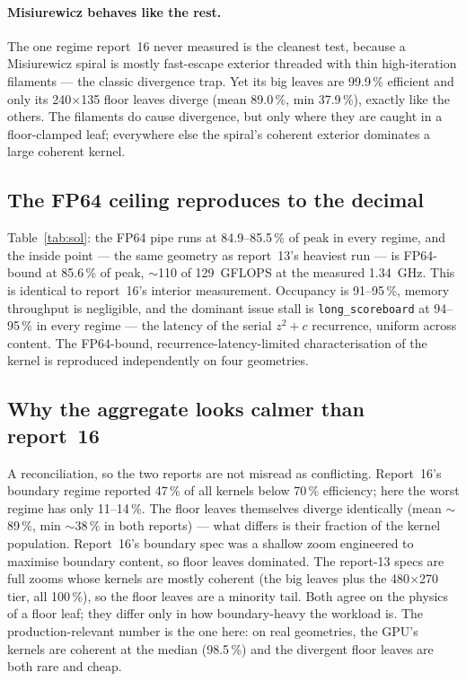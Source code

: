 \documentclass[
	english,
	letterpaper, oneside
]{article}
\begin{document}
\paragraph{Misiurewicz behaves like the rest.} The one regime report~16 never
measured is the cleanest test, because a Misiurewicz spiral is mostly fast-escape
exterior threaded with thin high-iteration filaments --- the classic divergence
trap. Yet its big leaves are 99.9\,\% efficient and only its 240$\times$135 floor
leaves diverge (mean 89.0\,\%, min 37.9\,\%), exactly like the others. The
filaments do cause divergence, but only where they are caught in a floor-clamped
leaf; everywhere else the spiral's coherent exterior dominates a large coherent
kernel.

\subsection{The FP64 ceiling reproduces to the decimal}

Table~\ref{tab:sol}: the FP64 pipe runs at 84.9--85.5\,\% of peak in every regime,
and the inside point --- the same geometry as report~13's heaviest run --- is
FP64-bound at 85.6\,\% of peak, $\sim$110 of 129~GFLOPS at the measured
1.34~GHz. This is identical to report~16's interior measurement. Occupancy is
91--95\,\%, memory throughput is negligible, and the dominant issue stall is
\texttt{long\_scoreboard} at 94--95\,\% in every regime --- the latency of the
serial $z^2{+}c$ recurrence, uniform across content. The FP64-bound,
recurrence-latency-limited characterisation of the kernel is reproduced
independently on four geometries.

\subsection{Why the aggregate looks calmer than report~16}

A reconciliation, so the two reports are not misread as conflicting. Report~16's
boundary regime reported 47\,\% of all kernels below 70\,\% efficiency;
here the worst regime has only 11--14\,\%. The floor leaves themselves diverge
identically (mean $\sim$89\,\%, min $\sim$38\,\% in both reports) --- what differs
is their fraction of the kernel population. Report~16's boundary spec was a
shallow zoom engineered to maximise boundary content, so floor leaves dominated.
The report-13 specs are full zooms whose kernels are mostly coherent (the big
leaves plus the 480$\times$270 tier, all 100\,\%), so the floor leaves are a
minority tail. Both agree on the physics of a floor leaf; they differ only in how
boundary-heavy the workload is. The production-relevant number is the one here:
on real geometries, the GPU's kernels are coherent at the median (98.5\,\%) and
the divergent floor leaves are both rare and cheap.
\end{document}
